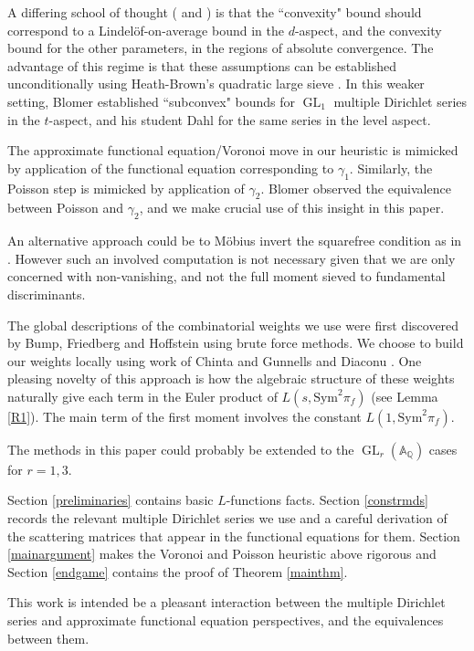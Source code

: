\documentclass[12pt,reqno]{amsart}
\theoremstyle{plain}
\theoremstyle{remark}
\numberwithin{equation}{section}
\numberwithin{lemma}{section}
\numberwithin{theorem}{section}
\numberwithin{prop}{section}
\numberwithin{remark}{section}
\begin{document}
A differing school of thought (\cite{Blo} and \cite{Dah}) is that the 
``convexity" bound should correspond to  
 a Lindel\"{o}f-on-average bound in the $d$-aspect, and the 
convexity bound for the other parameters, in the regions of absolute convergence.
The advantage of this regime is that these assumptions can be 
established unconditionally using Heath-Brown's quadratic large sieve
\cite{HB}.
In this weaker setting, 
Blomer \cite{Blo} established ``subconvex" bounds for 
$\operatorname{GL}_1$ multiple Dirichlet series in the $t$-aspect, and his student Dahl 
\cite{Dah} for the same series in the level aspect.

The approximate functional equation/Voronoi move in 
our heuristic is mimicked by application of the functional equation
corresponding to $\gamma_1$. Similarly, the Poisson step 
is mimicked by application of $\gamma_2$.
Blomer observed \cite{Blo} the equivalence between Poisson and $\gamma_2$, 
and we make crucial use of this 
insight in this paper.

An alternative approach could be to M\"{o}bius invert the squarefree
condition as in \cite{Pet}. However such an involved computation is not necessary
given that we are only concerned with non-vanishing, and not the full moment sieved
to fundamental discriminants.

The global descriptions of the combinatorial weights we use 
were first discovered by Bump, Friedberg and Hoffstein \cite[Theorem~1.2]{BFH} 
using brute force methods. We choose to build our weights locally using work
of Chinta and Gunnells \cite{CG1,CG2} and Diaconu \cite{Di}. One pleasing novelty 
of this approach is how the algebraic structure of these weights naturally give 
each term in the Euler product of $L(s,\text{Sym}^2 \pi_f)$ (see Lemma \ref{R1}).
The main term of the first moment involves the constant $L(1,\text{Sym}^2 \pi_f)$.

The methods in this paper could probably be extended to the 
$\operatorname{GL}_r(\mathbb{A}_{\mathbb{Q}})$ cases for $r=1,3$.

Section \ref{preliminaries} contains basic $L$-functions facts. Section \ref{constrmds}
records the relevant multiple Dirichlet series we use and a careful derivation of the scattering 
matrices that appear in the functional equations for them. Section \ref{mainargument}
makes the Voronoi and Poisson heuristic above rigorous and Section \ref{endgame} 
contains the proof of Theorem \ref{mainthm}.

This work is intended be a pleasant interaction between the multiple Dirichlet series 
and approximate functional equation perspectives, and the equivalences between them.
\end{document}

